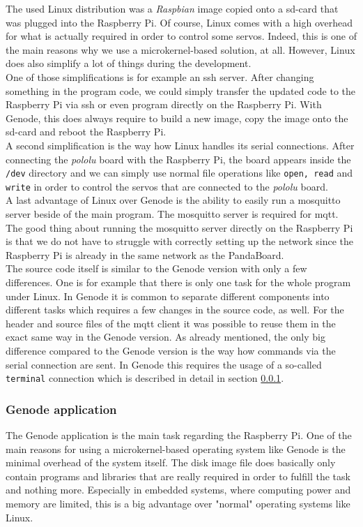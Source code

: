 The used Linux distribution was a \textit{Raspbian} image copied onto a sd-card that was plugged into the Raspberry Pi. Of course, Linux comes with a high overhead for what is actually required in order to control some servos. Indeed, this is one of the main reasons why we use a microkernel-based solution, at all. However, Linux does also simplify a lot of things during the development. \\

One of those simplifications is for example an ssh server. After changing something in the program code, we could simply transfer the updated code to the Raspberry Pi via ssh or even program directly on the Raspberry Pi. With Genode, this does always require to build a new image, copy the image onto the sd-card and reboot the Raspberry Pi. \\

A second simplification is the way how Linux handles its serial connections. After connecting the \textit{pololu} board with the Raspberry Pi, the board appears inside the \texttt{/dev} directory and we can simply use normal file operations like \texttt{open, read} and \texttt{write} in order to control the servos that are connected to the \textit{pololu} board. \\

A last advantage of Linux over Genode is the ability to easily run a mosquitto server beside of the main program. The mosquitto server is required for mqtt. The good thing about running the mosquitto server directly on the Raspberry Pi is that we do not have to struggle with correctly setting up the network since the Raspberry Pi is already in the same network as the PandaBoard. \\

The source code itself is similar to the Genode version with only a few differences. One is for example that there is only one task for the whole program under Linux. In Genode it is common to separate different components into different tasks which requires a few changes in the source code, as well. For the header and source files of the mqtt client it was possible to reuse them in the exact same way in the Genode version. As already mentioned, the only big difference compared to the Genode version is the way how commands via the serial connection are sent. In Genode this requires the usage of a so-called \texttt{terminal} connection which is described in detail in section \ref{sec:pi-genode}.

\subsubsection{Genode application}
\label{sec:pi-genode}
The Genode application is the main task regarding the Raspberry Pi. One of the main reasons for using a microkernel-based operating system like Genode is the minimal overhead of the system itself. The disk image file does basically only contain programs and libraries that are really required in order to fulfill the task and nothing more. Especially in embedded systems, where computing power and memory are limited, this is a big advantage over "normal" operating systems like Linux. \\

